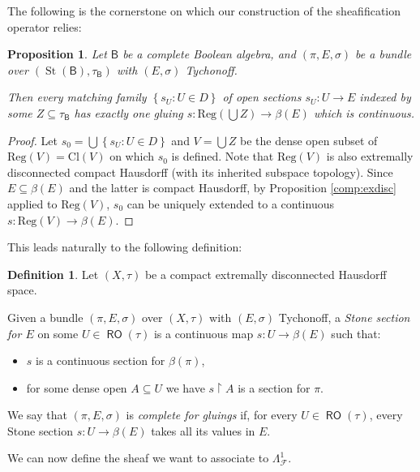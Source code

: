 \documentclass[11pt]{amsart}
\newcommand{\F}{\mathcal{F}}
\theoremstyle{plain}
\newtheorem{proposition}[theorem]{Proposition}
\theoremstyle{definition}
\newtheorem{definition}[theorem]{Definition}
\theoremstyle{plain}
\theoremstyle{remark}
\DeclareMathOperator{\St}{St}
\DeclareMathOperator{\RO}{\mathsf{RO}}
\newcommand{\bool}[1]{\mathsf{#1}}
\newcommand{\Cl}[1]{\mathrm{Cl}\left(#1\right)}
\newcommand{\Reg}[1]{\mathrm{Reg}\left(#1\right)}
\newcommand{\bp}[1]{\left\lbrace #1 \right\rbrace}
\newcommand{\0}{\mathsf{0}}
\renewcommand{\1}{\mathsf{1}}
\renewcommand{\2}{\mathsf{2}}
\theoremstyle{definition}
\begin{document}
The following is the cornerstone on which our construction of the sheafification operator relies:

 \begin{proposition}\label{prop:existgluingHaus}
 Let $\bool{B}$ be a complete Boolean algebra, and 
 $(\pi,E,\sigma)$ be a bundle over $(\St(\bool{B}),\tau_\bool{B})$ with $(E,\sigma)$ Tychonoff.  

Then every matching family 
 $\bp{s_U:  U\in D}$ of open sections $s_U:U\to E$ indexed by some $Z\subseteq \tau_\bool{B}$ has exactly one gluing 
 $s:\Reg{\bigcup Z}\to \beta(E)$ which is continuous.
 \end{proposition}
 \begin{proof}
Let $s_0=\bigcup\bp{s_U:U\in D}$ and $V=\bigcup Z$ be the dense open subset  of $\Reg{V}=\Cl{V}$ on which $s_0$ is defined. Note that $\Reg{V}$ is also extremally disconnected compact Hausdorff (with its inherited subspace topology).
Since $E\subseteq\beta(E)$ and the latter is compact Hausdorff, by Proposition \ref{comp:exdisc} applied to $\Reg{V}$, $s_0$ can be uniquely extended to a continuous $s:\Reg{V}\to\beta(E)$.
\end{proof}

This leads naturally to the following definition:

\begin{definition}
Let $(X,\tau)$ be a compact extremally disconnected Hausdorff space.

Given a bundle $(\pi,E,\sigma)$ over $(X,\tau)$ with $(E,\sigma)$ Tychonoff, 
a \emph{Stone section for $E$} on some $U\in\RO(\tau)$ is a continuous map $s:U\to \beta(E)$ such that:
\begin{itemize}
\item $s$ is a continuous section for $\beta(\pi)$,
\item for some dense open $A\subseteq U$ we have
 $s\restriction A$ is a section for $\pi$.
\end{itemize}
We say that $(\pi,E,\sigma)$ is \emph{complete for gluings} if, for every $U\in\RO(\tau)$, every Stone section 
\(
s:U\to \beta(E)
\) takes all its values in $E$.
\end{definition}



We can now define the sheaf we want to associate to $\Lambda^1_\F$. 
\end{document}
